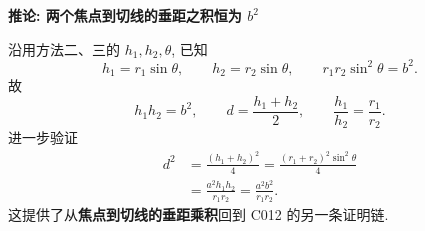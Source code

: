 \begin{proofbox}
\medskip
\textbf{推论: 两个焦点到切线的垂距之积恒为 $b^2$}

沿用方法二、三的 $h_1,h_2,\theta$, 已知
\[
h_1=r_1\sin\theta,\qquad h_2=r_2\sin\theta,
\qquad r_1r_2\sin^2\theta=b^2.
\]
故
\[
\boxed{h_1h_2=b^2},\qquad
\boxed{d=\frac{h_1+h_2}{2}},\qquad
\boxed{\frac{h_1}{h_2}=\frac{r_1}{r_2}}.
\]
进一步验证
\[
\begin{aligned}
d^2&=\frac{(h_1+h_2)^2}{4}
=\frac{(r_1+r_2)^2\sin^2\theta}{4}\\
&=\frac{a^2h_1h_2}{r_1r_2}
=\frac{a^2b^2}{r_1r_2}.
\end{aligned}
\]
这提供了从\textbf{焦点到切线的垂距乘积}回到 C012 的另一条证明链.
\end{proofbox}
